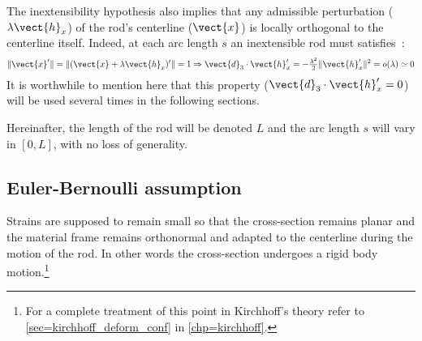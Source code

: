 The inextensibility hypothesis also implies that any admissible perturbation ($\lambda\vect{h}_x$) of the rod's centerline ($\vect{x}$) is locally orthogonal to the centerline itself. Indeed, at each arc length $s$ an inextensible rod must satisfies~:
\begin{equation}
	\|\vect{x}'\| = \|(\vect{x}+\lambda\vect{h}_x)'\| = 1 \Rightarrow \vect{d}_3 \cdot \vect{h}'_x = -\tfrac{\lambda^2}{2}\|\vect{h}'_x\|^2 = o(\lambda) \simeq 0
	\label{eq:axialstrain}
\end{equation}
It is worthwhile to mention here that this property ($\vect{d}_3 \cdot \vect{h}'_x = 0$) will be used several times in the following sections.

Hereinafter, the length of the rod will be denoted $L$ and the arc length $s$ will vary in $[0,L]$, with no loss of generality.

\subsection{Euler-Bernoulli assumption}
Strains are supposed to remain small so that the cross-section remains planar and the material frame remains orthonormal and adapted to the centerline during the motion of the rod. In other words the cross-section undergoes a rigid body motion.\footnote{For a complete treatment of this point in Kirchhoff's theory refer to \cref{sec=kirchhoff_deform_conf} in \cref{chp=kirchhoff}.}

